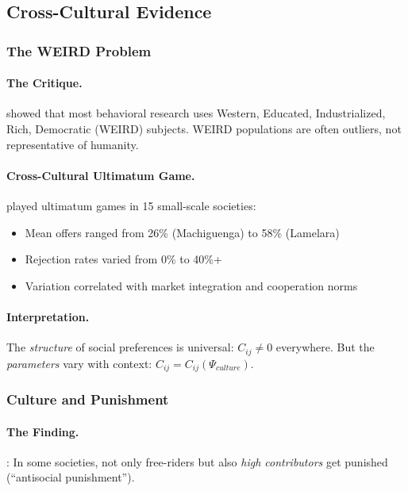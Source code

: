 \subsection{Cross-Cultural Evidence}

\subsubsection{The WEIRD Problem}

\paragraph{The Critique.}
\citet{henrich2010} showed that most behavioral research uses
Western, Educated, Industrialized, Rich, Democratic (WEIRD) subjects.
WEIRD populations are often outliers, not representative of humanity.

\paragraph{Cross-Cultural Ultimatum Game.}
\citet{henrich2000} played ultimatum games in 15 small-scale societies:
\begin{itemize}
  \item Mean offers ranged from 26\% (Machiguenga) to 58\% (Lamelara)
  \item Rejection rates varied from 0\% to 40\%+
  \item Variation correlated with market integration and cooperation norms
\end{itemize}

\paragraph{Interpretation.}
The \emph{structure} of social preferences is universal: $C_{ij} \neq 0$ everywhere.
But the \emph{parameters} vary with context: $C_{ij} = C_{ij}(\Psi_{culture})$.

\subsubsection{Culture and Punishment}

\paragraph{The Finding.}
\citet{herrmannthoeni2008}: In some societies, not only free-riders but also
\emph{high contributors} get punished (``antisocial punishment'').

